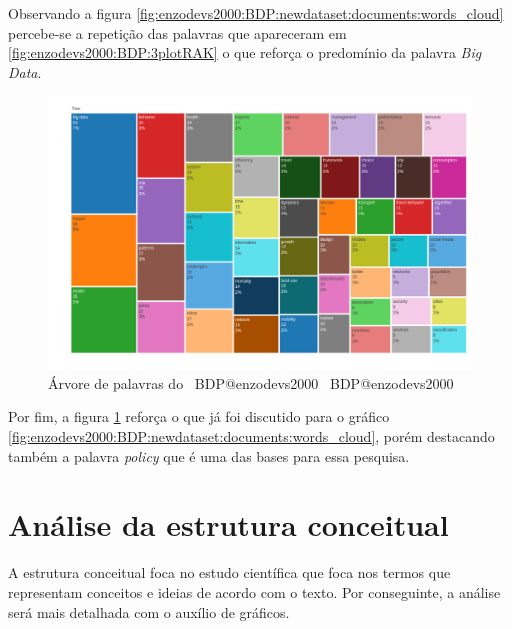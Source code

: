 Observando a figura \ref{fig:enzodevs2000:BDP:newdataset:documents:words_cloud} percebe-se a repetição das palavras que apareceram em \ref{fig:enzodevs2000:BDP:3plotRAK} o que reforça o predomínio da palavra \textit{Big Data}.

\begin{figure}[H]
    \centering
    \includegraphics[width=1\textwidth]{experiments/enzodevs2000/AnaliseBibliometrica/BigDataInPolicy/Figures/Graficos/NovoDataset/Documents/TreeMap.png}
    \caption{Árvore de palavras do \dataset\ BDP@enzodevs2000
    \dataset\ BDP@enzodevs2000}
    \label{fig:enzodevs2000:BDP:newdataset:documents:tree_map}
\end{figure}

 Por fim, a figura \ref{fig:enzodevs2000:BDP:newdataset:documents:tree_map} reforça o que já foi discutido para o gráfico \ref{fig:enzodevs2000:BDP:newdataset:documents:words_cloud}, porém destacando também a palavra \textit{policy} que é uma das bases para essa pesquisa.
 
 \section{Análise da estrutura conceitual}
 
 A estrutura conceitual foca no estudo científica que foca nos termos que representam conceitos e ideias de acordo com o texto. Por conseguinte, a análise será mais detalhada com o auxílio de gráficos.
 
